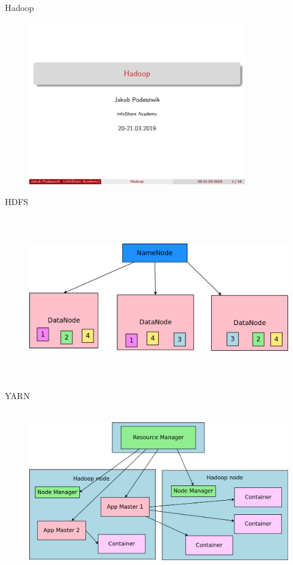 \documentclass{beamer}
\begin{document}
\begin{frame}{Hadoop}
	\begin{figure}
		\includegraphics[width=\textwidth,height=7cm,keepaspectratio=true]{hadoop}
	\end{figure}
\end{frame}
\begin{frame}{HDFS}
	\begin{figure}
		\includegraphics[width=\textwidth,height=7cm,keepaspectratio=true]{hdfs}
	\end{figure}
\end{frame}
\begin{frame}{YARN}
	\begin{figure}
		\includegraphics[width=\textwidth,height=7cm,keepaspectratio=true]{yarn}
	\end{figure}
\end{frame}
\end{document}
